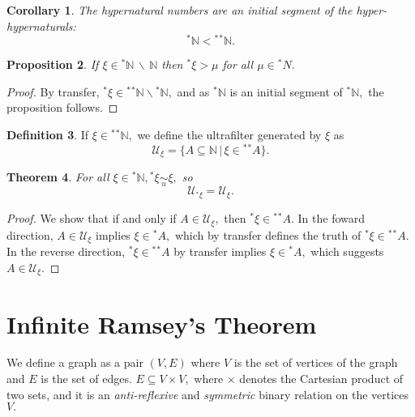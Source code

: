 \documentclass[12pt]{amsart}
\newcommand{\stt}{{}^*}
\newcommand{\NN}{\mathbb{N}}
\newcommand{\mcU}{\mathcal{U}}
\theoremstyle{plain}
\newtheorem{thm}{Theorem}
\newtheorem{cor}[thm]{Corollary}
\newtheorem{prop}[thm]{Proposition}
\theoremstyle{definition}
\newtheorem{defn}[thm]{Definition}
\theoremstyle{remark}
\theoremstyle{theorem}
\numberwithin{equation}{section}
\numberwithin{thm}{section}
\begin{document}
\begin{cor}
The hypernatural numbers are an initial segment of the hyper-hypernaturals:
\[ \stt \NN < \stt \stt \NN. \]
\end{cor}
\begin{prop}
If $\xi \in \stt \NN \, \backslash \, \NN$ then $\stt \xi > \mu$ for all $\mu \in \stt N.$
\end{prop}
\begin{proof}
By transfer, $\stt \xi \in \stt \stt \NN \backslash \stt \NN,$ and as $\stt \NN$ is an initial segment of $\stt \NN,$ the proposition follows.
\end{proof}
\begin{defn}
If $\xi \in \stt \stt \NN,$ we define the ultrafilter generated by $\xi$ as \[\mcU_\xi = \{A \subseteq \NN \, | \, \xi \in \stt \stt A \}.\]
\end{defn}
\begin{thm}
For all $\xi \in \stt \NN, \stt \xi \underset{u}{\sim} \xi,$ so 
\[\mcU_{\stt \xi} = \mcU_\xi.\]
\end{thm}
\begin{proof}
We show that if and only if $A \in \mcU_\xi,$ then $\stt \xi \in \stt \stt A.$ In the foward direction, $A \in \mcU_\xi$ implies $\xi \in \stt A,$ which by transfer defines the truth of $\stt \xi \in \stt \stt A.$ In the reverse direction, $\stt \xi \in \stt \stt A$ by transfer implies $\xi \in \stt A,$ which suggests $A \in \mcU_\xi.$
\end{proof}

\section{Infinite Ramsey's Theorem}
We define a graph as a pair $(V,E)$ where $V$ is the set of vertices of the graph and $E$ is the set of edges. $E \subseteq V \times V,$ where $\times$ denotes the Cartesian product of two sets, and it is an \textit{anti-reflexive} and \textit{symmetric} binary relation on the vertices $V.$ 
\end{document}
